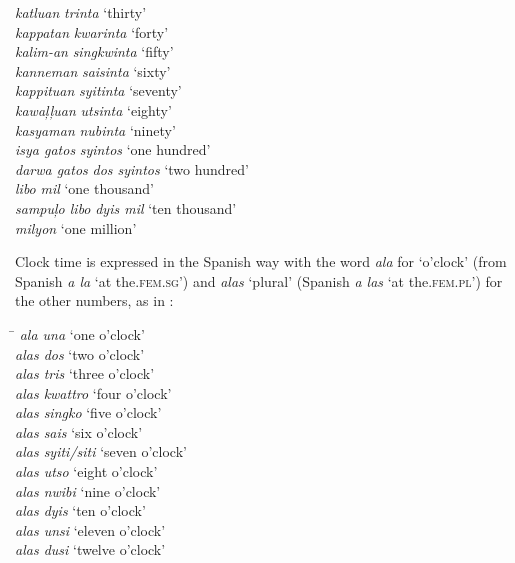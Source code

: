 \begin{tabbing}
\textit{katluan                }       \> \textit{trinta } \>  ‘thirty’ \\
\textit{kappatan               }       \> \textit{kwarinta } \>  ‘forty’ \\
\textit{kalim-an               }       \> \textit{singkwinta } \>  ‘fifty’ \\
\textit{kanneman               }       \> \textit{saisinta } \>  ‘sixty’ \\
\textit{kappituan              }       \> \textit{syitinta } \>  ‘seventy’ \\
\textit{kawaļļuan              }       \> \textit{utsinta } \>  ‘eighty’ \\
\textit{kasyaman               }       \> \textit{nubinta  } \>  ‘ninety’ \\
\textit{isya gatos             }       \> \textit{syintos } \>  ‘one hundred’ \\
\textit{darwa gatos            }       \> \textit{dos syintos } \>  `two hundred' \\
\textit{libo                   }       \> \textit{mil     } \>  ‘one thousand’ \\
\textit{sampuļo libo           }       \> \textit{dyis mil } \>  ‘ten thousand’ \\
                                       \> \textit{milyon  }  \> ‘one million’
\end{tabbing}
\z

\largerpage
Clock time is expressed in the Spanish way with the word \textit{ala} for `o’clock' (from Spanish \textit{a la} ‘at the.\textsc{fem.sg}’) and \textit{alas} ‘plural’ (Spanish \textit{a las} ‘at the.\textsc{fem.pl}’) for the other numbers, as in :

\ea
\label{bkm:Ref329088549}
\begin{tabbing}
\hspace{3cm} \= \kill
\textit{ala una } \>  ‘one o’clock’ \\
\textit{alas dos } \>  ‘two o’clock’ \\
\textit{alas tris } \>  ‘three o’clock’ \\
\textit{alas kwattro } \>  ‘four o’clock’ \\
\textit{alas singko } \>  ‘five o’clock’ \\
\textit{alas sais } \>  ‘six o’clock’ \\
\textit{alas syiti/siti } \>  ‘seven o’clock’ \\
\textit{alas utso } \>  ‘eight o’clock’ \\
\textit{alas nwibi } \>  ‘nine o’clock’ \\
\textit{alas dyis } \>  ‘ten o’clock’ \\
\textit{alas unsi } \>  ‘eleven o’clock’ \\
\textit{alas dusi } \>  ‘twelve o’clock’
\end{tabbing}
\z

